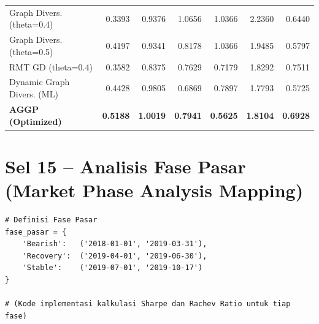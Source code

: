 \documentclass[12pt,a4paper]{article}
\begin{document}
\begin{table}[h!]
\begin{tabular}{lrrrrrr}
        Graph Divers. (theta=0.4)   & 0.3393 & 0.9376 & 1.0656 & 1.0366 & 2.2360 & 0.6440 \\
        Graph Divers. (theta=0.5)   & 0.4197 & 0.9341 & 0.8178 & 1.0366 & 1.9485 & 0.5797 \\
        RMT GD (theta=0.4)          & 0.3582 & 0.8375 & 0.7629 & 0.7179 & 1.8292 & 0.7511 \\
        Dynamic Graph Divers. (ML)  & 0.4428 & 0.9805 & 0.6869 & 0.7897 & 1.7793 & 0.5725 \\
        \textbf{AGGP (Optimized)}   & \textbf{0.5188} & \textbf{1.0019} & \textbf{0.7941} & \textbf{0.5625} & \textbf{1.8104} & \textbf{0.6928} \\
        \bottomrule
    \end{tabular}
\end{table}

\section{Sel 15 -- Analisis Fase Pasar (Market Phase Analysis Mapping)}

\begin{lstlisting}[caption={Kalkulasi Metrik Berdasarkan Fase Pasar}]
# Definisi Fase Pasar
fase_pasar = {
    'Bearish':   ('2018-01-01', '2019-03-31'),
    'Recovery':  ('2019-04-01', '2019-06-30'),
    'Stable':    ('2019-07-01', '2019-10-17')
}

# (Kode implementasi kalkulasi Sharpe dan Rachev Ratio untuk tiap fase)
\end{lstlisting}
\end{document}
